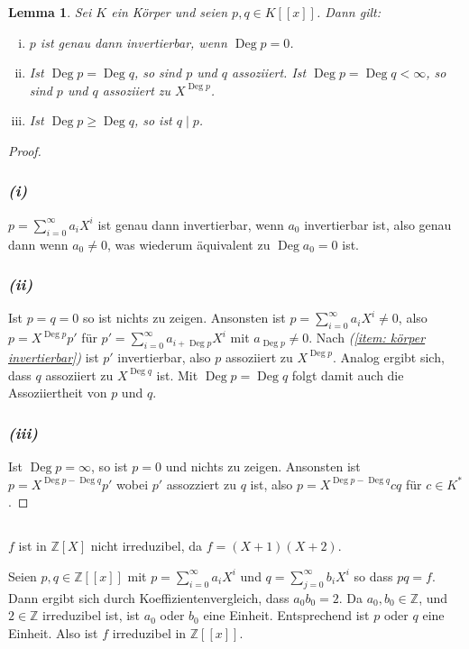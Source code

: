 \documentclass[a4paper,10pt]{article}
\newcounter{satze}
\newtheorem{lem}[satze]{Lemma}
\theoremstyle{definition}
\newcommand{\Z}{\mathbb{Z}}
\newcommand{\Deg}{\operatorname{Deg}}
\begin{document}
\begin{lem} \label{lem: starkes Lemma}
 Sei $K$ ein Körper und seien $p,q \in K[\![x]\!]$. Dann gilt:
 \begin{enumerate}[(i)]
  \item $p$ ist genau dann invertierbar, wenn $\Deg p = 0$. \label{item: körper invertierbar}
  \item Ist $\Deg p = \Deg q$, so sind $p$ und $q$ assoziiert. Ist $\Deg p = \Deg q < \infty$, so sind $p$ und $q$ assoziiert zu $X^{\Deg p}$.
  \item Ist $\Deg p \geq \Deg q$, so ist $q \mid p$.
 \end{enumerate}
\end{lem}
\begin{proof}
 \subsubsection*{\emph{(i)}}
  $p = \sum_{i=0}^{\infty} a_i X^i$ ist genau dann invertierbar, wenn $a_0$ invertierbar ist, also genau dann wenn $a_0 \neq 0$, was wiederum äquivalent zu $\Deg a_0 = 0$ ist.
 \subsubsection*{\emph{(ii)}}
  Ist $p = q = 0$ so ist nichts zu zeigen. Ansonsten ist $p = \sum_{i=0}^\infty a_i X^i \neq 0$, also $p = X^{\Deg p} p'$ für $p' = \sum_{i=0}^\infty a_{i+\Deg p} X^i$ mit $a_{\Deg p} \neq 0$. Nach \emph{(\ref{item: körper invertierbar})} ist $p'$ invertierbar, also $p$ assoziiert zu $X^{\Deg p}$. Analog ergibt sich, dass $q$ assoziiert zu $X^{\Deg q}$ ist. Mit $\Deg p = \Deg q$ folgt damit auch die Assoziiertheit von $p$ und $q$.
 \subsubsection*{\emph{(iii)}}
 Ist $\Deg p = \infty$, so ist $p = 0$ und nichts zu zeigen. Ansonsten ist $p = X^{\Deg p - \Deg q} p'$ wobei $p'$ assozziert zu $q$ ist, also $p = X^{\Deg p - \Deg q} c q$ für $c \in K^*$.
\end{proof}


\subsection{}
$f$ ist in $\Z[X]$ nicht irreduzibel, da $f = (X+1)(X+2)$.

Seien $p,q \in \Z[\![x]\!]$ mit $p = \sum_{i=0}^\infty a_i X^i$ und $q = \sum_{j=0}^\infty b_i X^i$ so dass $pq = f$. Dann ergibt sich durch Koeffizientenvergleich, dass $a_0 b_0 = 2$. Da $a_0, b_0 \in \Z$, und $2 \in \Z$ irreduzibel ist, ist $a_0$ oder $b_0$ eine Einheit. Entsprechend ist $p$ oder $q$ eine Einheit. Also ist $f$ irreduzibel in $\Z[\![x]\!]$.
\end{document}

